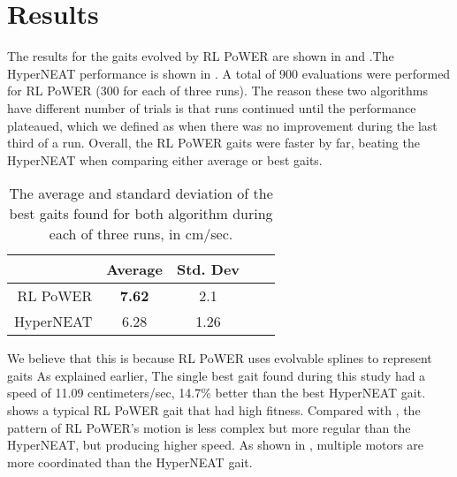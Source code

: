 \section{Results}
The results for the gaits evolved by RL PoWER are shown in  and .The HyperNEAT performance is shown in . A total of 900 evaluations were performed for RL PoWER (300 for each of three runs). The reason these two algorithms have different number of trials is that runs continued until the performance plateaued, which we defined as when there was no improvement during the last third of a run. Overall, the RL PoWER gaits were
faster by far, beating the HyperNEAT when comparing
either average or best gaits.


\begin{table}
\begin{center}
\begin{tabular}{|r|c|c|c||c|}
\hline
                                         & Average & Std. Dev \\
\hline                                    
\hline                                    
RL PoWER                       & {\bf 7.62}  &    2.1   \\
\hline
HyperNEAT                      & 6.28   &   1.26   \\
\hline
\end{tabular}
\caption{The average and standard deviation of the best gaits found
  for both algorithm during each of three runs, in cm/sec. }
\end{center}
\end{table}



We believe that this is because RL PoWER uses evolvable splines to represent gaits As explained earlier,  
The single best gait found during this study had a speed of 11.09 centimeters/sec,  14.7\% better  than the best HyperNEAT gait.  shows a typical RL PoWER gait that had high fitness. Compared with , the pattern of RL PoWER's motion is less
complex but more regular than the HyperNEAT, but producing higher speed. As shown in 
, multiple motors are more coordinated than the HyperNEAT gait.

